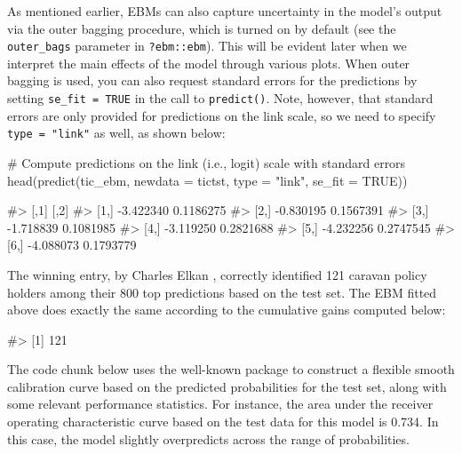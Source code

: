 As mentioned earlier, EBMs can also capture uncertainty in the model's
output via the outer bagging procedure, which is turned on by default
(see the \texttt{outer\_bags} parameter in \texttt{?ebm::ebm}). This
will be evident later when we interpret the main effects of the model
through various plots. When outer bagging is used, you can also request
standard errors for the predictions by setting \texttt{se\_fit\ =\ TRUE}
in the call to \texttt{predict()}. Note, however, that standard errors
are only provided for predictions on the link scale, so we need to
specify \texttt{type\ =\ "link"} as well, as shown below:

\begin{Schunk}
\begin{Sinput}
# Compute predictions on the link (i.e., logit) scale with standard errors
head(predict(tic_ebm, newdata = tictst, type = "link", se_fit = TRUE))
\end{Sinput}
\begin{Soutput}
#>           [,1]      [,2]
#> [1,] -3.422340 0.1186275
#> [2,] -0.830195 0.1567391
#> [3,] -1.718839 0.1081985
#> [4,] -3.119250 0.2821688
#> [5,] -4.232256 0.2747545
#> [6,] -4.088073 0.1793779
\end{Soutput}
\end{Schunk}

The winning entry, by Charles Elkan \citep{elkan-2001-coil}, correctly
identified 121 caravan policy holders among their 800 top predictions
based on the test set. The EBM fitted above does exactly the same
according to the cumulative gains computed below:

\begin{Schunk}
\begin{Soutput}
#> [1] 121
\end{Soutput}
\end{Schunk}

The code chunk below uses the well-known  package
\citep{R-rms} to construct a flexible smooth calibration curve based on
the predicted probabilities for the test set, along with some relevant
performance statistics. For instance, the area under the receiver
operating characteristic curve based on the test data for this model is
0.734. In this case, the model slightly overpredicts across the range of
probabilities.


